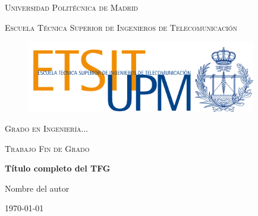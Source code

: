 \begin{titlepage}
    \begin{center}
        \vspace{1cm}
        \LARGE{\textsc{Universidad Politécnica de Madrid}}\par
        \vspace{0.3cm}
        \large{\textsc{Escuela Técnica Superior de Ingenieros de Telecomunicación}} \par
    \end{center}
    
    \begin{figure}[H]
        \vspace{1cm}
        \centering
        \includegraphics[width=10cm]{portada/logosportada/logoetsit.png}
    \end{figure}

    \begin{center}
        \vspace{1.5cm}
        \Large{\textsc{Grado en Ingeniería...}}\par
        \vspace{0.2cm}
        \LARGE{\textsc{Trabajo Fin de Grado}}\par
        \vspace{2.5cm}
        \Huge{\textbf{Título completo del TFG}}

        \vspace*{2.5cm}
                  \large{ Nombre del autor }
        \par\vspace{2cm}
               \small{\today}
    \end{center}
\end{titlepage}